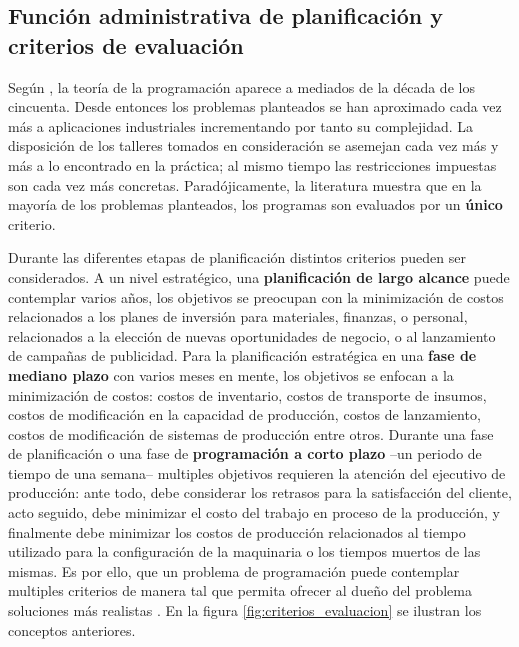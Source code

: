 \documentclass[spanish,draft,12pt,headsepline,footsepline,paper=letter]{scrreprt}
\begin{document}
\subsection{Función administrativa de planificación y criterios de evaluación}

Según \citet[p.~1]{TKindt2002}, la teoría de la programación aparece a mediados de la década de los cincuenta. Desde entonces los problemas planteados se han aproximado cada vez más a aplicaciones industriales incrementando por tanto su complejidad. La disposición de los talleres tomados en consideración se asemejan cada vez más y más a lo encontrado en la práctica; al mismo tiempo las restricciones impuestas son cada vez más concretas.  Paradójicamente, la literatura muestra que en la mayoría de los problemas planteados, los programas son evaluados por un \textbf{único} criterio.

Durante las diferentes etapas de planificación distintos criterios pueden ser considerados. A un nivel estratégico, una \textbf{planificación de largo alcance} puede contemplar varios años, los objetivos se preocupan con la minimización de costos relacionados a los planes de inversión para materiales, finanzas, o personal, relacionados a la elección de nuevas oportunidades de negocio, o al lanzamiento de campañas de publicidad. Para la planificación estratégica en una \textbf{fase de mediano plazo} con varios meses en mente, los objetivos se enfocan a la minimización de costos: costos de inventario, costos de transporte de insumos, costos de modificación en la capacidad de producción, costos de lanzamiento, costos de modificación de sistemas de producción entre otros. Durante una fase de planificación o una fase de \textbf{programación a corto plazo} –un periodo de tiempo de una semana– multiples objetivos requieren la atención del ejecutivo de producción: ante todo, debe considerar los retrasos para la satisfacción del cliente, acto seguido, debe minimizar el costo del trabajo en proceso de la producción, y finalmente debe minimizar los costos de producción relacionados al tiempo utilizado para la configuración de la maquinaria o los tiempos muertos de las mismas. Es por ello, que un problema de programación puede contemplar multiples criterios de manera tal que permita ofrecer al dueño del problema soluciones más realistas \citep[p.~1]{TKindt2002}. En la figura \ref{fig:criterios_evaluacion} se ilustran los conceptos anteriores.
\end{document}
